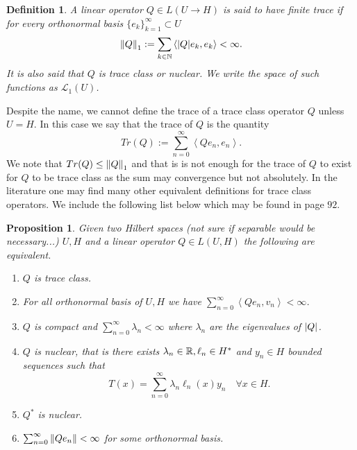 \documentclass[12pt]{article}
\newtheorem{proposition}{Proposition}
\newtheorem{definition}{Definition}
\newcommand{\br}[1]{\left\langle#1\right\rangle}
\begin{document}
\begin{definition}
    A linear operator $Q\in L(U\to H)$ is said to have finite trace if for every orthonormal basis $\{e_k\}_{k=1}^\infty \subset  U$
    \begin{equation*}
        \norm{Q}_1:=\sum_{k\in\mathbb{N}}\br{\abs{Q}e_k,e_k}<\infty.
    \end{equation*}
    It is also said that $Q$ is trace class or nuclear. We write the space of such functions as $\mathcal{L}_1(U)$.
\end{definition}
Despite the name, we cannot define the trace of a trace class operator $Q$ unless  $U=H$. In this case we say that the trace of $Q$ is the quantity
\begin{equation*}
    Tr(Q):=\sum_{n=0}^{\infty} \br{Q e_n,e_n}.
\end{equation*}
We note that $Tr(Q)\leq \norm{Q}_1$ and that is is not enough for the trace of $Q$ to exist for $Q$ to be trace class as the sum may convergence but not absolutely. In the literature one may find many other equivalent definitions for trace class operators. We include the following list below which may be found in \cite{lototsky2017stochastic} page $92$.
\begin{proposition} Given two Hilbert spaces (not sure if separable would be necessary...) $U,H$ and a linear operator  $Q\in L(U,H)$ the following are equivalent.
    \begin{enumerate}
        \item $Q$ is trace class.
        \item For all orthonormal basis of $U,H$ we have $\sum_{n=0}^{\infty} \br{Qe_n,v_n}<\infty$.
        \item $Q$ is compact and  $\sum_{n=0}^{\infty} \lambda _n<\infty$ where $\lambda _n$ are the eigenvalues of $\abs{Q}$.
        \item $Q$ is nuclear, that is there exists  $\lambda _n \in {\mathbb R},\ell_n \in H^*$ and $y_n \in H$ bounded sequences such that
              \begin{equation*}
                  T(x)=\sum_{n=0}^{\infty} \lambda _n\ell_n(x)y_n \quad\forall x\in H.
              \end{equation*}
        \item $Q^*$ is nuclear.
        \item $\sum_{n=0}^{\infty} \norm{Qe_n}<\infty$ for some orthonormal basis.

    \end{enumerate}
\end{proposition}
\end{document}
